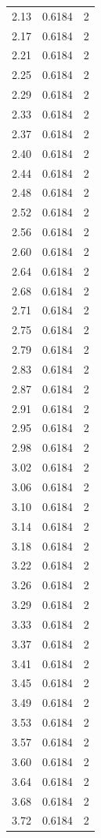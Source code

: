 \begin{longtable}{lrr}
  2.13 & 0.6184 & 2 \\
  2.17 & 0.6184 & 2 \\
  2.21 & 0.6184 & 2 \\
  2.25 & 0.6184 & 2 \\
  2.29 & 0.6184 & 2 \\
  2.33 & 0.6184 & 2 \\
  2.37 & 0.6184 & 2 \\
  2.40 & 0.6184 & 2 \\
  2.44 & 0.6184 & 2 \\
  2.48 & 0.6184 & 2 \\
  2.52 & 0.6184 & 2 \\
  2.56 & 0.6184 & 2 \\
  2.60 & 0.6184 & 2 \\
  2.64 & 0.6184 & 2 \\
  2.68 & 0.6184 & 2 \\
  2.71 & 0.6184 & 2 \\
  2.75 & 0.6184 & 2 \\
  2.79 & 0.6184 & 2 \\
  2.83 & 0.6184 & 2 \\
  2.87 & 0.6184 & 2 \\
  2.91 & 0.6184 & 2 \\
  2.95 & 0.6184 & 2 \\
  2.98 & 0.6184 & 2 \\
  3.02 & 0.6184 & 2 \\
  3.06 & 0.6184 & 2 \\
  3.10 & 0.6184 & 2 \\
  3.14 & 0.6184 & 2 \\
  3.18 & 0.6184 & 2 \\
  3.22 & 0.6184 & 2 \\
  3.26 & 0.6184 & 2 \\
  3.29 & 0.6184 & 2 \\
  3.33 & 0.6184 & 2 \\
  3.37 & 0.6184 & 2 \\
  3.41 & 0.6184 & 2 \\
  3.45 & 0.6184 & 2 \\
  3.49 & 0.6184 & 2 \\
  3.53 & 0.6184 & 2 \\
  3.57 & 0.6184 & 2 \\
  3.60 & 0.6184 & 2 \\
  3.64 & 0.6184 & 2 \\
  3.68 & 0.6184 & 2 \\
  3.72 & 0.6184 & 2 \\

\end{longtable}
